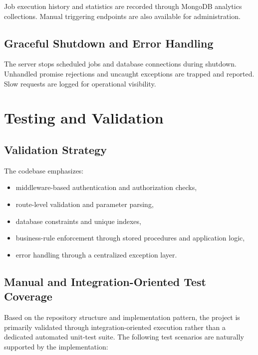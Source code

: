 \documentclass[12pt,a4paper]{report}
\begin{document}
Job execution history and statistics are recorded through MongoDB analytics collections. Manual triggering endpoints are also available for administration.

\section{Graceful Shutdown and Error Handling}
The server stops scheduled jobs and database connections during shutdown. Unhandled promise rejections and uncaught exceptions are trapped and reported. Slow requests are logged for operational visibility.

\chapter{Testing and Validation}
\section{Validation Strategy}
The codebase emphasizes:
\begin{itemize}[leftmargin=1.5em]
    \item middleware-based authentication and authorization checks,
    \item route-level validation and parameter parsing,
    \item database constraints and unique indexes,
    \item business-rule enforcement through stored procedures and application logic,
    \item error handling through a centralized exception layer.
\end{itemize}

\section{Manual and Integration-Oriented Test Coverage}
Based on the repository structure and implementation pattern, the project is primarily validated through integration-oriented execution rather than a dedicated automated unit-test suite. The following test scenarios are naturally supported by the implementation:
\end{document}
